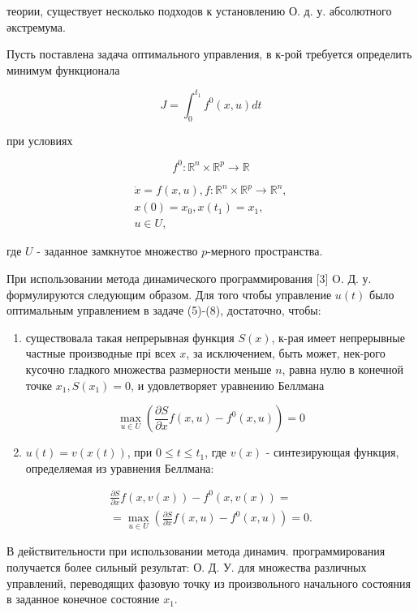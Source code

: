 \documentclass[10pt]{article}
\begin{document}
теории, существует несколько подходов к установлению О. д. у. абсолютного әкстремума.

Пусть поставлена задача оптимального управления, в к-рой требуется определить минимум функционала

\[
J=\int_{0}^{t_{1}} f^{0}(x, u) d t
\]

при условиях

\[
f^{0}: \mathbb{R}^{n} \times \mathbb{R}^{p} \rightarrow \mathbb{R}
\]

\[
\begin{gathered}
\dot{x}=f(x, u), f: \mathbb{R}^{n} \times \mathbb{R}^{p} \rightarrow \mathbb{R}^{n}, \\
x(0)=x_{0}, x\left(t_{1}\right)=x_{1}, \\
u \in U,
\end{gathered}
\]

где $U$ - заданное замкнутое множество $p$-мерного пространства.

При использовании метода динамического программирования [3] O. Д. у. формулируются следующим образом. Для того чтобы управление $u(t)$ было оптимальным управлением в задаче (5)-(8), достаточно, чтобы:

\begin{enumerate}
  \item существовала такая непрерывная функция $S(x)$, к-рая имеет непрерывные частные производные прі всех $x$, за исключением, быть может, нек-рого кусочно гладкого множества размерности меньше $n$, равна нулю в конечной точке $x_{1}, S\left(x_{1}\right)=0$, и удовлетворяет уравнению Беллмана
\end{enumerate}

\[
\max _{u \in U}\left(\frac{\partial S}{\partial x} f(x, u)-f^{0}(x, u)\right)=0
\]

\begin{enumerate}
  \setcounter{enumi}{1}
  \item $u(t)=v(x(t))$, при $0 \leqslant t \leqslant t_{1}$, где $v(x)$ - синтезирующая функция, определяемая из уравнения Беллмана:
\end{enumerate}

\[
\begin{gathered}
\frac{\partial S}{\partial x} f(x, v(x))-f^{0}(x, v(x))= \\
=\max _{u \in U}\left(\frac{\partial S}{\partial x} f(x, u)-f^{0}(x, u)\right)=0 .
\end{gathered}
\]

В действительности при использовании метода динамич. программирования получается более сильный результат: О. Д. У. для множества различных управлений, переводящих фазовую точку из произвольного начального состояния в заданное конечное состояние $x_{1}$.
\end{document}
